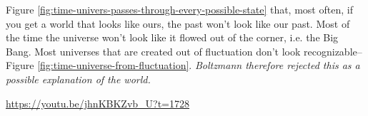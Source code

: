 \documentclass[]{article}
\begin{document}
Figure \ref{fig:time-univers-passes-through-every-possible-state} that, most often, if you get a world that looks like ours, the past won't look like our past. Most of the time the universe won't look like it flowed out of the corner, i.e. the Big Bang. Most universes that are created out of fluctuation don't look recognizable--Figure \ref{fig:time-universe-from-fluctuation}. \emph{Boltzmann therefore rejected this as a possible explanation of the world.}

\url{https://youtu.be/jhnKBKZvb_U?t=1728}


\raggedright

\end{document}
